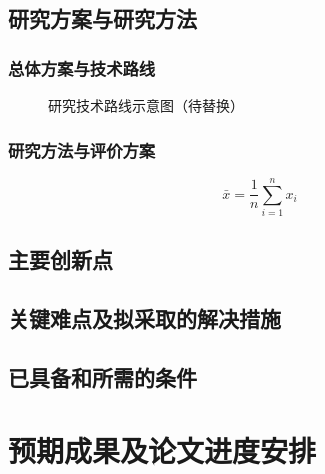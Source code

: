 \documentclass[UTF8,fontset=fandol,zihao=-4,oneside,openany]{ctexbook}
\newif\ifShowHints
\newcommand{\hint}[1]{\ifShowHints{\color{black!55}#1}\par\fi}
\begin{document}
\section{研究方案与研究方法}
\subsection{总体方案与技术路线}
\hint{【说明设计流程或技术路线。下图为占位示例，引用外部图片须注明出处。】}
\begin{figure}[htbp]
  \centering
  \caption{研究技术路线示意图（待替换）}
  \label{fig:research-route}
\end{figure}

\subsection{研究方法与评价方案}
\hint{【说明研究方法、数据来源、实验或用户研究流程、评价指标及可行性。式（\ref{eq:example}）为编号示例，提交前替换或删除。】}
\begin{equation}
  \label{eq:example}
  \bar{x}=\frac{1}{n}\sum_{i=1}^{n}x_i
\end{equation}

\section{主要创新点}
\hint{【对照已有研究，说明预期的设计或技术贡献及其验证依据。】}

\section{关键难点及拟采取的解决措施}
\hint{【逐项说明关键难点、产生原因、应对措施、替代方案及验证方法。】}

\section{已具备和所需的条件}
\hint{【说明已有工作基础、阶段性进展、设备和实验条件、数据与软件资源、外协计划及经费；明确尚待解决的条件问题。】}

\chapter{预期成果及论文进度安排}
\end{document}
